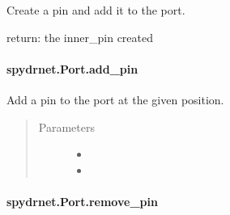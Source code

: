 \documentclass[letterpaper,10pt,english,openany,oneside]{sphinxmanual}
\begin{document}
\begin{fulllineitems}
\label{\detokenize{reference/classes/generated/spydrnet.Port.create_pin:spydrnet.Port.create_pin}}
Create a pin and add it to the port.

return:
the inner\_pin created

\end{fulllineitems}



\paragraph{spydrnet.Port.add\_pin}
\label{\detokenize{reference/classes/generated/spydrnet.Port.add_pin:spydrnet-port-add-pin}}\label{\detokenize{reference/classes/generated/spydrnet.Port.add_pin::doc}}

\begin{fulllineitems}
\label{\detokenize{reference/classes/generated/spydrnet.Port.add_pin:spydrnet.Port.add_pin}}
Add a pin to the port at the given position.
\begin{quote}\begin{description}
\item[{Parameters}] \leavevmode\begin{itemize}
\item {} 

\item {} 

\end{itemize}

\end{description}\end{quote}

\end{fulllineitems}



\paragraph{spydrnet.Port.remove\_pin}
\label{\detokenize{reference/classes/generated/spydrnet.Port.remove_pin:spydrnet-port-remove-pin}}\label{\detokenize{reference/classes/generated/spydrnet.Port.remove_pin::doc}}
\end{document}
